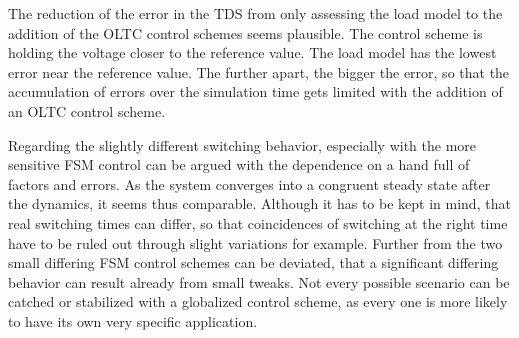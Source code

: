The reduction of the error in the \acs{TDS} from only assessing the load model to the addition of the \acs{OLTC} control schemes seems plausible.
The control scheme is holding the voltage closer to the reference value. 
The load model has the lowest error near the reference value.
The further apart, the bigger the error, so that the accumulation of errors over the simulation time gets limited with the addition of an \acs{OLTC} control scheme.

Regarding the slightly different switching behavior, especially with the more sensitive \acs{FSM} control can be argued with the dependence on a hand full of factors and errors.
As the system converges into a congruent steady state after the dynamics, it seems thus comparable.
Although it has to be kept in mind, that real switching times can differ, so that coincidences of switching at the right time have to be ruled out through slight variations for example.
Further from the two small differing \acs{FSM} control schemes can be deviated, that a significant differing behavior can result already from small tweaks.
Not every possible scenario can be catched or stabilized with a globalized control scheme, as every one is more likely to have its own very specific application.



